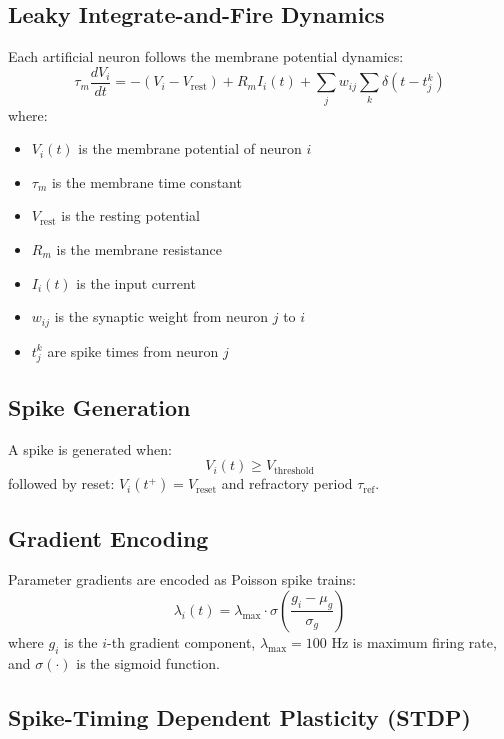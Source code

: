 \documentclass[12pt,a4paper]{article}
\begin{document}
\subsection{Leaky Integrate-and-Fire Dynamics}

Each artificial neuron follows the membrane potential dynamics:
\begin{equation}
\tau_m \frac{dV_i}{dt} = -(V_i - V_{\text{rest}}) + R_m I_i(t) + \sum_{j} w_{ij} \sum_k \delta(t - t_j^k)
\end{equation}
where:
\begin{itemize}
\item $V_i(t)$ is the membrane potential of neuron $i$
\item $\tau_m$ is the membrane time constant
\item $V_{\text{rest}}$ is the resting potential
\item $R_m$ is the membrane resistance
\item $I_i(t)$ is the input current
\item $w_{ij}$ is the synaptic weight from neuron $j$ to $i$
\item $t_j^k$ are spike times from neuron $j$
\end{itemize}

\subsection{Spike Generation}

A spike is generated when:
\begin{equation}
V_i(t) \geq V_{\text{threshold}}
\end{equation}
followed by reset: $V_i(t^+) = V_{\text{reset}}$ and refractory period $\tau_{\text{ref}}$.

\subsection{Gradient Encoding}

Parameter gradients are encoded as Poisson spike trains:
\begin{equation}
\lambda_i(t) = \lambda_{\max} \cdot \sigma\left(\frac{g_i - \mu_g}{\sigma_g}\right)
\end{equation}
where $g_i$ is the $i$-th gradient component, $\lambda_{\max} = 100$ Hz is maximum firing rate, and $\sigma(\cdot)$ is the sigmoid function.

\subsection{Spike-Timing Dependent Plasticity (STDP)}
\end{document}
